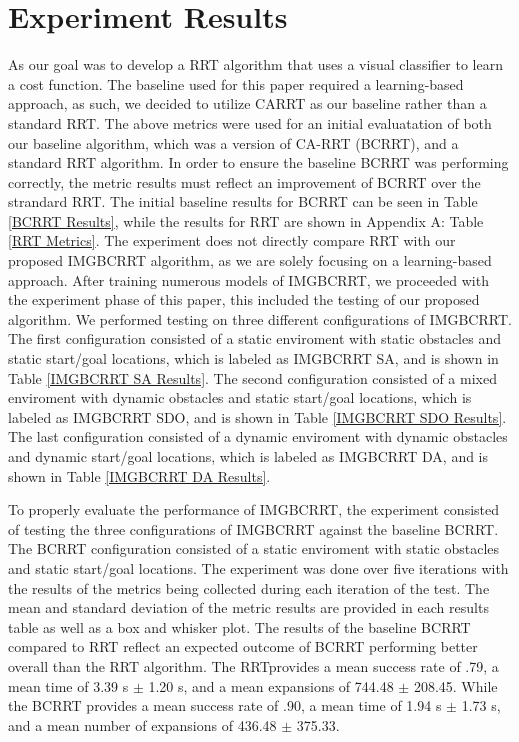 \documentclass{article}
\begin{document}
\section{Experiment Results}
As our goal was to develop a RRT algorithm that uses a visual classifier to learn a cost function. The baseline used for this paper required a learning-based approach, as such, we decided to utilize CARRT as our baseline rather than a standard RRT. The above metrics were used for an initial evaluatation of both our baseline algorithm, which was a version of CA-RRT (BCRRT), and a standard RRT algorithm. In order to ensure the baseline BCRRT was performing correctly, the metric results must reflect an improvement of BCRRT over the strandard RRT. The initial baseline results for BCRRT can be seen in Table \ref{BCRRT Results}, while the results for RRT are shown in Appendix A: Table \ref{RRT Metrics}. The experiment does not directly compare RRT with our proposed IMGBCRRT algorithm, as we are solely focusing on a learning-based approach. After training numerous models of IMGBCRRT, we proceeded with the experiment phase of this paper, this included the testing of our proposed algorithm. We performed testing on three different configurations of IMGBCRRT. The first configuration consisted of a static enviroment with static obstacles and static start/goal locations, which is labeled as IMGBCRRT SA, and is shown in Table \ref{IMGBCRRT SA Results}. The second configuration consisted of a mixed enviroment with dynamic obstacles and static start/goal locations, which is labeled as IMGBCRRT SDO, and is shown in Table \ref{IMGBCRRT SDO Results}. The last configuration consisted of a dynamic enviroment with dynamic obstacles and dynamic start/goal locations, which is labeled as IMGBCRRT DA, and is shown in Table \ref{IMGBCRRT DA Results}. 

To properly evaluate the performance of IMGBCRRT, the experiment consisted of testing the three configurations of IMGBCRRT against the baseline BCRRT. The BCRRT configuration consisted of a static enviroment with static obstacles and static start/goal locations. The experiment was done over five iterations with the results of the metrics being collected during each iteration of the test. The mean and standard deviation of the metric results are provided in each results table as well as a box and whisker plot. The results of the baseline BCRRT compared to RRT reflect an expected outcome of  BCRRT performing better overall than the RRT algorithm. The RRTprovides a mean success rate of .79, a mean time of 3.39 s $\pm$ 1.20 s, and a mean expansions of 744.48 $\pm$ 208.45. While the BCRRT provides a mean success rate of .90, a mean time of 1.94 s $\pm$ 1.73 s, and a mean number of expansions of 436.48 $\pm$ 375.33.
\end{document}
